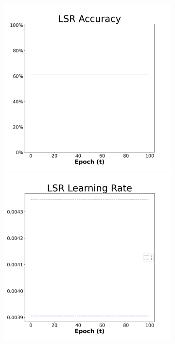 \begin{figure}[H]
    \centering %
\begin{subfigure}{0.3\textwidth}
  \includegraphics[width=\linewidth]{images/exper1/SP/LSR_0.01_acc.png}
    \includegraphics[width=\linewidth]{images/exper1/SP/LSR_0.01_lr.png}

\end{subfigure}
\end{figure}
